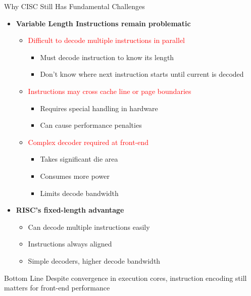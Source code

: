\documentclass[aspectratio=169,12pt]{beamer}
\begin{document}
\begin{frame}{Why CISC Still Has Fundamental Challenges}
\begin{itemize}
    \item \textbf{Variable Length Instructions remain problematic}
    \begin{itemize}
        \item \textcolor{red}{Difficult to decode multiple instructions in parallel}
        \begin{itemize}
            \item Must decode instruction to know its length
            \item Don't know where next instruction starts until current is decoded
        \end{itemize}
        \item \textcolor{red}{Instructions may cross cache line or page boundaries}
        \begin{itemize}
            \item Requires special handling in hardware
            \item Can cause performance penalties
        \end{itemize}
        \item \textcolor{red}{Complex decoder required at front-end}
        \begin{itemize}
            \item Takes significant die area
            \item Consumes more power
            \item Limits decode bandwidth
        \end{itemize}
    \end{itemize}
    \vspace{0.5cm}
    \item \textbf{RISC's fixed-length advantage}
    \begin{itemize}
        \item \textcolor{mygreen}{Can decode multiple instructions easily}
        \item \textcolor{mygreen}{Instructions always aligned}
        \item \textcolor{mygreen}{Simple decoders, higher decode bandwidth}
    \end{itemize}
\end{itemize}

\vspace{0.3cm}
\begin{alertblock}{Bottom Line}
Despite convergence in execution cores, instruction encoding still matters for front-end performance
\end{alertblock}
\end{frame}
\end{document}
